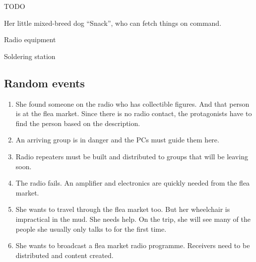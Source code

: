 \begin{npcBox}[title=Antigone]
    \begin{stunts}
    \item {}
    \end{stunts}

    \begin{stressSection}
    \end{stressSection}
    \begin{tabularx}{\textwidth}{ XX }
    \end{tabularx}

    \begin{consequences}
    \item {}
    \item {}
    \item {}
    \end{consequences}

    \begin{npcDescription}
    TODO
    \end{npcDescription}


    \begin{equipment}
    \item Her little mixed-breed dog “Snack”, who can fetch things on command.
    \item Radio equipment
    \item Soldering station
    \end{equipment}
\end{npcBox}

\subsection{Random events}

\begin{enumerate}
\item She found someone on the radio who has collectible figures. And that person is at the flea market. Since there is no radio contact, the protagonists have to find the person based on the description.
\item An arriving group is in danger and the PCs must guide them here.
\item Radio repeaters must be built and distributed to groups that will be leaving soon.
\item The radio fails. An amplifier and electronics are quickly needed from the flea market.
\item She wants to travel through the flea market too. But her wheelchair is impractical in the mud. She needs help. On the trip, she will see many of the people she usually only talks to for the first time.
\item She wants to broadcast a flea market radio programme. Receivers need to be distributed and content created.
\end{enumerate}

